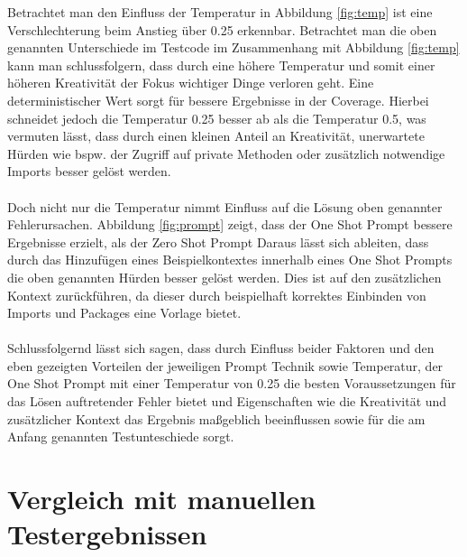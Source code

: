 Betrachtet man den Einfluss der Temperatur in Abbildung \ref{fig:temp} ist eine Verschlechterung beim Anstieg über 0.25 erkennbar.  Betrachtet man die oben genannten Unterschiede im Testcode im Zusammenhang mit Abbildung \ref{fig:temp} kann man schlussfolgern, dass durch eine höhere Temperatur und somit einer höheren Kreativität der Fokus wichtiger Dinge verloren geht. Eine deterministischer Wert sorgt für bessere Ergebnisse in der Coverage. Hierbei schneidet jedoch die Temperatur 0.25 besser ab als die Temperatur 0.5, was vermuten lässt, dass durch einen kleinen Anteil an Kreativität, unerwartete Hürden wie bspw. der Zugriff auf private Methoden oder zusätzlich notwendige Imports besser gelöst werden.\\\\
Doch nicht nur die Temperatur nimmt Einfluss auf die Lösung oben genannter Fehlerursachen. Abbildung \ref{fig:prompt} zeigt, dass der One Shot Prompt bessere Ergebnisse erzielt, als der Zero Shot Prompt Daraus lässt sich ableiten, dass durch das Hinzufügen eines Beispielkontextes innerhalb eines One Shot Prompts die oben genannten Hürden besser gelöst werden. Dies ist auf den zusätzlichen Kontext zurückführen, da dieser durch beispielhaft korrektes Einbinden von Imports und Packages eine Vorlage bietet.\\\\
Schlussfolgernd lässt sich sagen, dass durch Einfluss beider Faktoren und den eben gezeigten Vorteilen der jeweiligen Prompt Technik sowie Temperatur, der One Shot Prompt mit einer Temperatur von 0.25 die besten Voraussetzungen für das Lösen auftretender Fehler bietet und Eigenschaften wie die Kreativität und zusätzlicher Kontext das Ergebnis maßgeblich beeinflussen sowie für die am Anfang genannten Testunteschiede sorgt.

\section{Vergleich mit manuellen Testergebnissen}